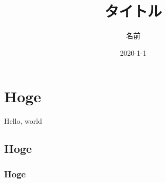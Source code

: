\documentclass{jsarticle}
\title{タイトル}
\author{名前}
\date{2020-1-1}
\begin{document}
\maketitle

\section{Hoge}
Hello, world

\subsection{Hoge}

\subsubsection{Hoge}
\end{document}
